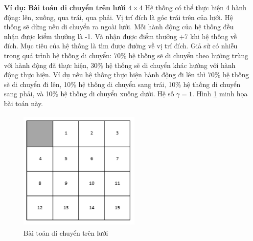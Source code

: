 \textbf{Ví dụ: Bài toán di chuyển trên lưới $4 \times 4$} Hệ thống có thể thực hiện 4 hành động: lên, xuống, qua trái, qua phải. Vị trí đích là góc trái trên của lưới. Hệ thống sẽ dừng nếu di chuyển ra ngoài lưới. Mỗi hành động của hệ thống đều nhận được kiểm thưởng là -1. Và nhận được điểm thưởng +7 khi hệ thống về đích. Mục tiêu của hệ thống là tìm được đường về vị trí đích.
Giả sử có nhiễu trong quá trình hệ thống di chuyển: 70\% hệ thống sẽ di chuyển theo hướng trùng với hành động đã thực hiện, 30\% hệ thống sẽ di chuyển khác hướng với hành động thực hiện. Ví dụ nếu hệ thống thực hiện hành động đi lên thì 70\% hệ thống sẽ di chuyển đi lên, 10\% hệ thống di chuyển sang trái, 10\% hệ thống di chuyển sang phải, và 10\% hệ thống di chuyển xuống dưới. Hệ số $\gamma = 1$. Hình \ref{grid_problem} minh họa bài toán này.
\begin{figure}
	\centering
	\includegraphics[width=60mm, height =60mm]{baitoan.PNG}
	\caption[Bài toán di chuyển trên lưới]{Bài toán di chuyển trên lưới}
	\label{grid_problem}
\end{figure}

